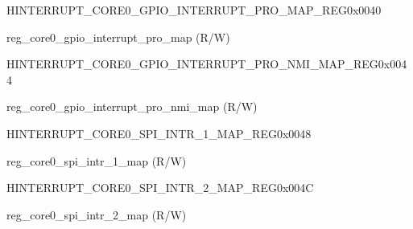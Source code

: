 \begin{register}{H}{INTERRUPT\_CORE0\_GPIO\_INTERRUPT\_PRO\_MAP\_REG}{0x0040}\label{regdesc:INTERRUPTCORE0GPIOINTERRUPTPROMAPREG}
%
%
\regnewline%
\begin{regdesc}\begin{reglist}
\label{fielddesc:INTERRUPTCORE0GPIOINTERRUPTPROMAP}\item [INTERRUPT\_CORE0\_GPIO\_INTERRUPT\_PRO\_MAP] reg\_core0\_gpio\_interrupt\_pro\_map (R/W)
\end{reglist}\end{regdesc}
\end{register}


\begin{register}{H}{INTERRUPT\_CORE0\_GPIO\_INTERRUPT\_PRO\_NMI\_MAP\_REG}{0x0044}\label{regdesc:INTERRUPTCORE0GPIOINTERRUPTPRONMIMAPREG}
%
%
\regnewline%
\begin{regdesc}\begin{reglist}
\label{fielddesc:INTERRUPTCORE0GPIOINTERRUPTPRONMIMAP}\item [INTERRUPT\_CORE0\_GPIO\_INTERRUPT\_PRO\_NMI\_MAP] reg\_core0\_gpio\_interrupt\_pro\_nmi\_map (R/W)
\end{reglist}\end{regdesc}
\end{register}


\begin{register}{H}{INTERRUPT\_CORE0\_SPI\_INTR\_1\_MAP\_REG}{0x0048}\label{regdesc:INTERRUPTCORE0SPIINTR1MAPREG}
%
%
\regnewline%
\begin{regdesc}\begin{reglist}
\label{fielddesc:INTERRUPTCORE0SPIINTR1MAP}\item [INTERRUPT\_CORE0\_SPI\_INTR\_1\_MAP] reg\_core0\_spi\_intr\_1\_map (R/W)
\end{reglist}\end{regdesc}
\end{register}


\begin{register}{H}{INTERRUPT\_CORE0\_SPI\_INTR\_2\_MAP\_REG}{0x004C}\label{regdesc:INTERRUPTCORE0SPIINTR2MAPREG}
%
%
\regnewline%
\begin{regdesc}\begin{reglist}
\label{fielddesc:INTERRUPTCORE0SPIINTR2MAP}\item [INTERRUPT\_CORE0\_SPI\_INTR\_2\_MAP] reg\_core0\_spi\_intr\_2\_map (R/W)
\end{reglist}\end{regdesc}
\end{register}


